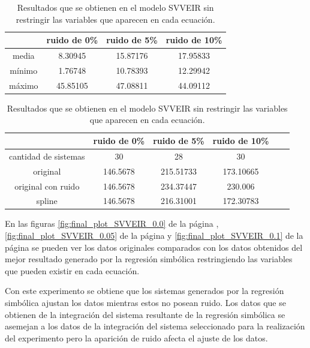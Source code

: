 \begin{table}[!h]
    \centering
    \caption{Resultados que se obtienen en el modelo SVVEIR sin restringir las variables que aparecen en cada ecuación.}
    \begin{tabular}{|c|c|c|c|}
        \hline
               & \textbf{ruido de 0\%} & \textbf{ruido de 5\%} & \textbf{ruido de 10\%} \\
        \hline
        media  & 8.30945               & 15.87176              & 17.95833               \\
        \hline
        mínimo & 1.76748               & 10.78393              & 12.29942               \\
        \hline
        máximo & 45.85105              & 47.08811              & 44.09112               \\
        \hline
    \end{tabular}

    \begin{tabular}{|c|c|c|c|c|c|}
        \hline
                             & \textbf{ruido de 0\%} & \textbf{ruido de 5\%} & \textbf{ruido de 10\%} \\
        \hline
        cantidad de sistemas & 30                    & 28                    & 30                     \\
        \hline
        original             & 146.5678              & 215.51733             & 173.10665              \\
        \hline
        original con ruido   & 146.5678              & 234.37447             & 230.006                \\
        \hline
        spline               & 146.5678              & 216.31001             & 172.30783              \\
        \hline
    \end{tabular}
    \label{table:experiment_SVVEIR_all}
\end{table}

En las figuras \ref{fig:final_plot_SVVEIR_0.0} de la página \pageref{fig:final_plot_SVVEIR_0.0}, \ref{fig:final_plot_SVVEIR_0.05} de la página \pageref{fig:final_plot_SVVEIR_0.05} y \ref{fig:final_plot_SVVEIR_0.1} de la página \pageref{fig:final_plot_SVVEIR_0.1} se pueden ver los datos originales comparados con los datos obtenidos del mejor resultado generado por la regresión simbólica restringiendo las variables que pueden existir en cada ecuación.

Con este experimento se obtiene que los sistemas generados por la regresión simbólica ajustan los datos mientras estos no posean ruido. Los datos que se obtienen de la integración del sistema resultante de la regresión simbólica se asemejan a los datos de la integración del sistema seleccionado para la realización del experimento pero la aparición de ruido afecta el ajuste de los datos.

